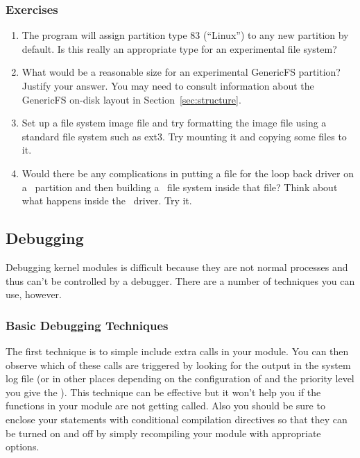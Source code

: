 \subsubsection*{Exercises}

\begin{enumerate}

\item The  program will assign partition type 83 (``Linux'') to any new partition
  by default. Is this really an appropriate type for an experimental file system?

\item What would be a reasonable size for an experimental GenericFS partition? Justify your
  answer. You may need to consult information about the GenericFS on-disk layout in
  Section~\ref{sec:structure}.

\item Set up a file system image file and try formatting the image file using a standard file
  system such as ext3. Try mounting it and copying some files to it.

\item Would there be any complications in putting a file for the loop back driver on a
  \GenericFS\ partition and then building a \GenericFS\ file system inside that file? Think
  about what happens inside the \GenericFS\ driver. Try it.

\end{enumerate}

\subsection{Debugging \GenericFS}
\label{sec:debugging}

Debugging kernel modules is difficult because they are not normal processes and thus can't be
controlled by a debugger. There are a number of techniques you can use, however.

\subsubsection{Basic Debugging Techniques}

The first technique is to simple include extra  calls in your module. You can then
observe which of these calls are triggered by looking for the output in the system log file (or
in other places depending on the configuration of  and the priority level you
give the ). This technique can be effective but it won't help you if the functions
in your module are not getting called. Also you should be sure to enclose your 
statements with conditional compilation directives so that they can be turned on and off by
simply recompiling your module with appropriate options.

